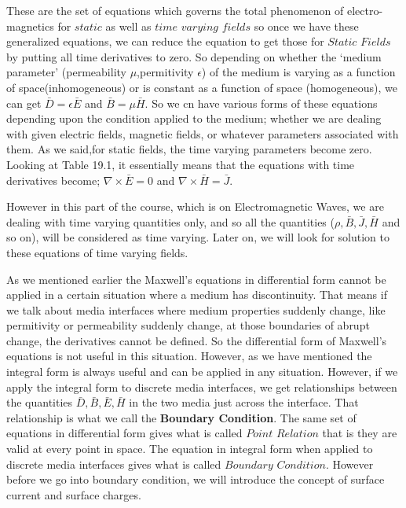 These are the set of equations which governs the total phenomenon of electro-magnetics for $static$ as well as $time$ $varying$ $fields$ so once we have these generalized equations, we can reduce the equation to get those for $Static$ $Fields$ by putting all time derivatives to zero. So depending on whether the `medium parameter' (permeability $\mu$,permitivity $\epsilon$) of the medium is varying as a function of space(inhomogeneous) or is constant as a function of space (homogeneous), we can get $\bar{D}=\epsilon\bar{E}$ and $\bar{B}=\mu\bar{H}$. So we cn have various forms of these equations depending upon the condition applied to the medium; whether we are dealing with given electric fields, magnetic fields, or whatever parameters associated with them. As we said,for static fields, the time varying parameters become zero. Looking at Table 19.1, it essentially means that the equations with time derivatives become; $\nabla\times\bar{E}=0$ and $\nabla\times\bar{H}=\bar{J}$.

However in this part of the course, which is on Electromagnetic Waves, we are dealing with time varying quantities only, and so all the quantities ($\rho,\bar{B},\bar{J},\bar{H}$ and so on), will be considered as time varying. Later on, we will look for solution to these equations of time varying fields.

As we mentioned earlier the Maxwell's equations in differential form cannot be applied in a certain situation where a medium has discontinuity. That means if we talk about media interfaces where medium properties suddenly change, like permitivity or permeability suddenly change, at those boundaries of abrupt change, the derivatives cannot be defined. So the differential form of Maxwell's equations is not useful in this situation. However, as we have mentioned the integral form is always useful and can be applied in any situation. However, if we apply the integral form to discrete media interfaces, we get relationships between the quantities $\bar{D}, \bar{B}, \bar{E}, \bar{H}$ in the two media just across the interface. That relationship is what we call the \textbf{Boundary Condition}. The same set of equations in differential form gives what is called $Point$ $Relation$ that is they are valid at every point in space. The equation in integral form when applied to discrete media interfaces gives what is called $Boundary$ $Condition$. However before we go into boundary condition, we will introduce the concept of surface current and surface charges.

